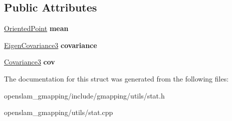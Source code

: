 \subsection*{Public Attributes}
\begin{DoxyCompactItemize}
\item 
\mbox{\label{structGMapping_1_1Gaussian3_a64b17b61e1bd87923d0c9f65192792ca}} 
\hyperlink{structGMapping_1_1orientedpoint}{Oriented\+Point} {\bfseries mean}
\item 
\mbox{\label{structGMapping_1_1Gaussian3_a3131844c0d9825570f28796fdf5ff92c}} 
\hyperlink{structGMapping_1_1EigenCovariance3}{Eigen\+Covariance3} {\bfseries covariance}
\item 
\mbox{\label{structGMapping_1_1Gaussian3_a4bea7121bbfe1ff39436d49ad8c950b2}} 
\hyperlink{structGMapping_1_1Covariance3}{Covariance3} {\bfseries cov}
\end{DoxyCompactItemize}


The documentation for this struct was generated from the following files\+:\begin{DoxyCompactItemize}
\item 
openslam\+\_\+gmapping/include/gmapping/utils/stat.\+h\item 
openslam\+\_\+gmapping/utils/stat.\+cpp\end{DoxyCompactItemize}
